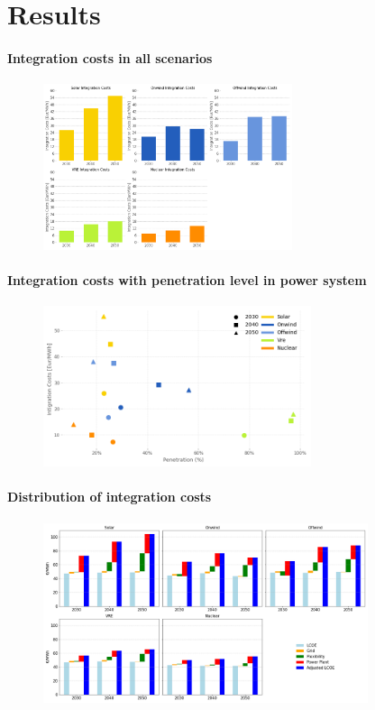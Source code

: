 \documentclass[aspectratio=169]{beamer}
\begin{document}
\section{Results}
\begin{frame}{\insertsectionhead}
\framesubtitle{Integration costs in all scenarios}
\begin{figure}
    \centering
    \includegraphics[width=0.65\textwidth]{overnight_inti.png}
  
  \end{figure}
\end{frame}

\begin{frame}{\insertsectionhead}
\framesubtitle{Integration costs with penetration level in power system}
\begin{figure}
    \centering
    \includegraphics[width=0.7\textwidth]{pen.png}
  
  \end{figure}
\end{frame}


\begin{frame}{\insertsectionhead}
\framesubtitle{Distribution of integration costs}
\begin{figure}
    \centering
    \includegraphics[width=0.85\textwidth]{cossts.png}
  
  \end{figure}
\end{frame}
\end{document}
